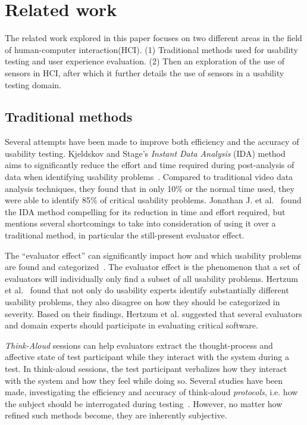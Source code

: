 \section{Related work}
The related work explored in this paper focuses on two different areas in the field of human-computer interaction(HCI). (1) Traditional methods used for usability testing and user experience evaluation. (2) Then an exploration of the use of sensors in HCI, after which it further details the use of sensors in a usability testing domain.

\subsection{Traditional methods}
Several attempts have been made to improve both efficiency and the accuracy of
usability testing. Kjeldskov and Stage's \textit{Instant Data
Analysis} (IDA) method aims to significantly reduce the effort and time required
during post-analysis of data when identifying usability
problems~\cite{instant_data_analysis}. Compared to traditional video data
analysis techniques, they found that in only 10\% or the normal time used, they were able to
identify 85\% of critical usability problems. Jonathan J. et
al.~\cite{use_of_TA_and_IDA} found the IDA
method compelling for its reduction in time and effort required, but mentions
several shortcomings to take into consideration of using it over a traditional
method, in particular the still-present evaluator effect.

The ``evaluator effect'' can significantly impact how and which usability problems are
found and categorized~\cite{eval_effect}.
The evaluator effect is the phenomenon that a set of evaluators will individually only find a subset of all usability problems.
Hertzum et al.~\cite{eval_effect_research} found that not only do
usability experts identify substantially different usability problems, they also
disagree on how they should be categorized in
severity. Based on their findings, Hertzum et al. suggested that
several evaluators and domain experts should participate in evaluating critical
software.

\textit{Think-Aloud} sessions can help evaluators extract the thought-process
and affective state of test participant while they interact with the system
during a test. In think-aloud sessions, the test participant verbalizes how
they interact with the system and how they feel while doing so.  Several studies
have been made, investigating the efficiency and accuracy of think-aloud
\textit{protocols}, i.e. how the subject should be interrogated during
testing~\cite{two_think_aloud_protocols_study}. However, no matter how refined
such methods become, they are inherently subjective.

